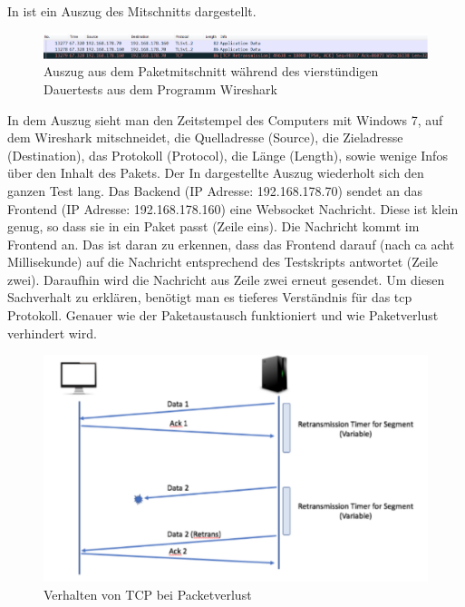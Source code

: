 In  ist ein Auszug des Mitschnitts dargestellt.
\begin{figure}[ht]
  \centering
  \includegraphics[width=\textwidth]{content/hauptteil/umsetzungPoC/pocTest/res/LatenzNormal4hWireshark.pdf}
  \caption{Auszug aus dem Paketmitschnitt während des vierstündigen Dauertests aus dem Programm Wireshark \citep{wireshark:program}}
  \label{fig:testing:latency4hNorm:wireshark}
\end{figure}
In dem Auszug sieht man den Zeitstempel des Computers mit Windows 7, auf dem Wireshark mitschneidet, die Quelladresse (Source), die Zieladresse (Destination), das Protokoll (Protocol), die Länge (Length), sowie wenige Infos über den Inhalt des Pakets.
Der In  dargestellte Auszug wiederholt sich den ganzen Test lang.
Das Backend (IP Adresse: 192.168.178.70) sendet an das Frontend (IP Adresse: 192.168.178.160) eine Websocket Nachricht. Diese ist klein genug, so dass sie in ein Paket passt (Zeile eins).
Die Nachricht kommt im Frontend an. Das ist daran zu erkennen, dass das Frontend darauf (nach ca acht Millisekunde) auf die Nachricht entsprechend des Testskripts antwortet (Zeile zwei).
Daraufhin wird die Nachricht aus Zeile zwei erneut gesendet.
Um diesen Sachverhalt zu erklären, benötigt man es tieferes Verständnis für das \ac{tcp} Protokoll. Genauer wie der Paketaustausch funktioniert und wie Paketverlust verhindert wird.
\begin{figure}[ht]
  \centering
  \includegraphics[width=\textwidth]{content/hauptteil/umsetzungPoC/pocTest/res/tcpPackageLostGraph.pdf}
  \caption{Verhalten von TCP bei Packetverlust \citep{tcp:articel}}
  \label{fig:testing:tcp:retrans}
\end{figure}
